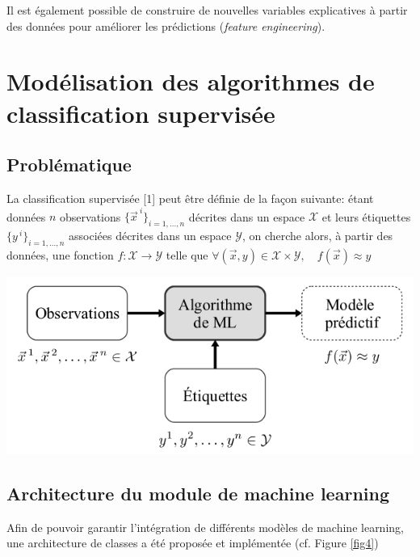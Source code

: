 Il est également possible de construire de nouvelles variables explicatives à partir des données pour améliorer les prédictions (\textit{feature engineering}). 

\section{Modélisation des algorithmes de classification supervisée}

\subsection{Problématique}

La classification supervisée [1] peut être définie de la façon suivante: étant données $n$ observations $\lbrace\vec{x}^{\:i}\rbrace_{i=1,...,n}$ décrites dans un espace $\mathcal{X}$ et leurs étiquettes $\lbrace y^{\:i}\rbrace_{i=1,...,n}$ associées décrites dans un espace $\mathcal{Y}$, on cherche alors, à partir des données, une fonction $f:\mathcal{X}\rightarrow\mathcal{Y}$ telle que $\forall(\vec{x},y)\in \mathcal{X}\times\mathcal{Y},\quad f(\vec{x})\approx y$

\begin{center}
\includegraphics[scale=0.8]{figures/apprentissage_supervise.png}
\label{fig3}
\end{center}

\subsection{Architecture du module de machine learning}

Afin de pouvoir garantir l’intégration de différents modèles de machine learning, une architecture de classes a été proposée et implémentée (cf. Figure \ref{fig4})

